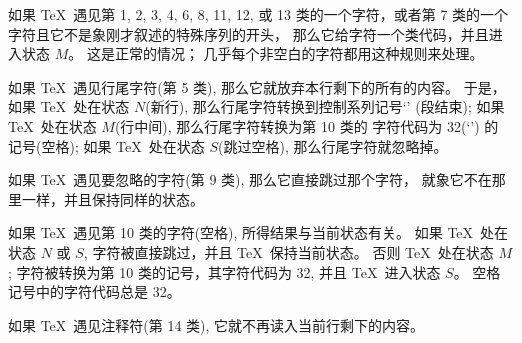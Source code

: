 {%
\ddanger 如果 \TeX\ 遇见第 1, 2, 3, 4, 6, 8, 11, 12,
 或 13 类的一个字符，或者第 7 类的一个字符且它不是象刚才叙述的特殊序列的开头，
那么它给字符一个类代码，并且进入状态 $M$。%
这是正常的情况；
几乎每个非空白的字符都用这种规则来处理。

\ddanger 如果 \TeX\ 遇见行尾字符(第 5 类), 那么它就放弃本行剩下的所有的内容。%
于是，如果 \TeX\ 处在状态 $N$(新行), 那么行尾字符转换到控制系列记号`'%
(段结束); 如果 \TeX\ 处在状态 $M$(行中间), 那么行尾字符转换为第 10 类的%
字符代码为 32(`\]') 的记号(空格);
如果 \TeX\ 处在状态 $S$(跳过空格), 那么行尾字符就忽略掉。

\ddanger 如果 \TeX\ 遇见要忽略的字符(第 9 类), 那么它直接跳过那个字符，
就象它不在那里一样，并且保持同样的状态。

\ddanger 如果 \TeX\ 遇见第 10 类的字符(空格), 所得结果与当前状态有关。%
如果 \TeX\ 处在状态 $N$ 或 $S$, 字符被直接跳过，并且 \TeX\ 保持当前状态。%
否则 \TeX\ 处在状态 $M$; 字符被转换为第 10 类的记号，其字符代码为 32,
并且 \TeX\ 进入状态 $S$。%
空格记号中的字符代码总是 32。

\ddanger 如果 \TeX\ 遇见注释符(第 14 类), 它就不再读入当前行剩下的内容。

}
